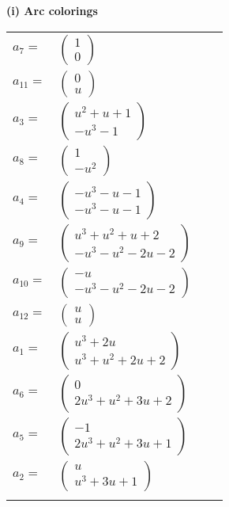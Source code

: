 \documentclass[1p]{elsarticle_modified}
\theoremstyle{definition}
\begin{document}
\flushleft \textbf{(i) Arc colorings}\\
\begin{tabular}{m{7pt} m{180pt} m{7pt} m{180pt} }
\flushright $a_{7}=$&$\begin{pmatrix}1\\0\end{pmatrix}$ \\
\flushright $a_{11}=$&$\begin{pmatrix}0\\u\end{pmatrix}$ \\
\flushright $a_{3}=$&$\begin{pmatrix}u^2+u+1\\- u^3-1\end{pmatrix}$ \\
\flushright $a_{8}=$&$\begin{pmatrix}1\\- u^2\end{pmatrix}$ \\
\flushright $a_{4}=$&$\begin{pmatrix}- u^3- u-1\\- u^3- u-1\end{pmatrix}$ \\
\flushright $a_{9}=$&$\begin{pmatrix}u^3+u^2+u+2\\- u^3- u^2-2 u-2\end{pmatrix}$ \\
\flushright $a_{10}=$&$\begin{pmatrix}- u\\- u^3- u^2-2 u-2\end{pmatrix}$ \\
\flushright $a_{12}=$&$\begin{pmatrix}u\\u\end{pmatrix}$ \\
\flushright $a_{1}=$&$\begin{pmatrix}u^3+2 u\\u^3+u^2+2 u+2\end{pmatrix}$ \\
\flushright $a_{6}=$&$\begin{pmatrix}0\\2 u^3+u^2+3 u+2\end{pmatrix}$ \\
\flushright $a_{5}=$&$\begin{pmatrix}-1\\2 u^3+u^2+3 u+1\end{pmatrix}$ \\
\flushright $a_{2}=$&$\begin{pmatrix}u\\u^3+3 u+1\end{pmatrix}$\\&\end{tabular}
\end{document}
